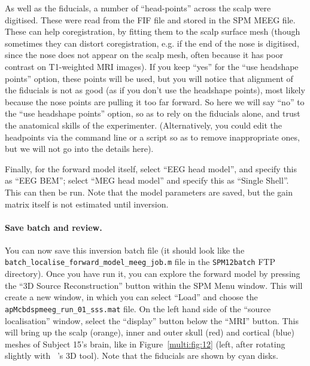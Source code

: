 As well as the fiducials, a number of ``head-points'' across the scalp were digitised. These were read from the FIF file and stored in the SPM MEEG file. These can help coregistration, by fitting them to the scalp surface mesh (though sometimes they can distort coregistration, e.g. if the end of the nose is digitised, since the nose does not appear on the scalp mesh, often because it has poor contrast on T1-weighted MRI images). If you keep ``yes'' for the ``use headshape points'' option, these points will be used, but you will notice that alignment of the fiducials is not as good (as if you don't use the headshape points), most likely because the nose points are pulling it too far forward. So here we will say ``no'' to the ``use headshape points'' option, so as to rely on the fiducials alone, and trust the anatomical skills of the experimenter. (Alternatively, you could edit the headpoints via the command line or a script so as to remove inappropriate ones, but we will not go into the details here).

Finally, for the forward model itself, select ``EEG head model'', and specify this as ``EEG BEM''; select ``MEG head model'' and specify this as ``Single Shell''. This can then be run. Note that the model parameters are saved, but the gain matrix itself is not estimated until inversion.

\paragraph{Save batch and review.}

You can now save this inversion batch file (it should look like the \texttt{batch\_localise\_forward\_model\_meeg\_job.m} file in the \texttt{SPM12batch} FTP directory). Once you have run it, you can explore the forward model by pressing the ``3D Source Reconstruction'' button within the SPM Menu window. This will create a new window, in which you can select ``Load'' and choose the \texttt{apMcbdspmeeg\_run\_01\_sss.mat} file.  On the left hand side of the ``source localisation'' window, select the ``display'' button below the ``MRI'' button. This will bring up the scalp (orange), inner and outer skull (red) and cortical (blue) meshes of Subject 15's brain, like in Figure~\ref{multi:fig:12} (left, after rotating slightly with \matlab\ 's 3D tool). Note that the fiducials are shown by cyan disks. 

